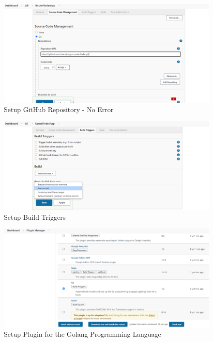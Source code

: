 \documentclass[12pt,a4paper,twoside]{article}
\begin{document}
\begin{figure}[h!]
    \centering
        \includegraphics[width=15cm]{images-aws/37-jenkins-setup-repo-no-error.png}
        \caption{Setup GitHub Repository - No Error}
\end{figure}


\begin{figure}[h!]
    \centering
        \includegraphics[width=15cm]{images-aws/38-jenkins-build-setup.png}
        \caption{Setup Build Triggers}
\end{figure}


\begin{figure}[h!]
    \centering
        \includegraphics[width=15cm]{images-aws/39-go-plugin.png}
        \caption{Setup Plugin for the Golang Programming Language}
\end{figure}
\end{document}
